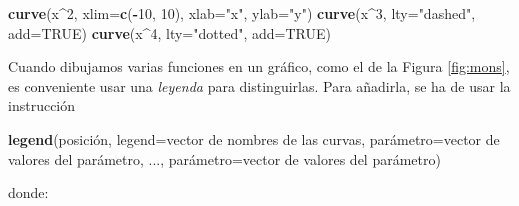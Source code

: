 \documentclass[
]{book}
\newenvironment{Shaded}{\begin{snugshade}}{\end{snugshade}}
\newcommand{\DataTypeTok}[1]{\textcolor[rgb]{0.13,0.29,0.53}{#1}}
\newcommand{\DecValTok}[1]{\textcolor[rgb]{0.00,0.00,0.81}{#1}}
\newcommand{\KeywordTok}[1]{\textcolor[rgb]{0.13,0.29,0.53}{\textbf{#1}}}
\newcommand{\NormalTok}[1]{#1}
\newcommand{\OperatorTok}[1]{\textcolor[rgb]{0.81,0.36,0.00}{\textbf{#1}}}
\newcommand{\OtherTok}[1]{\textcolor[rgb]{0.56,0.35,0.01}{#1}}
\newcommand{\StringTok}[1]{\textcolor[rgb]{0.31,0.60,0.02}{#1}}
\theoremstyle{definition}
\theoremstyle{definition}
\theoremstyle{definition}
\theoremstyle{remark}
\begin{document}
\begin{Shaded}
\begin{Highlighting}[]
\KeywordTok{curve}\NormalTok{(x}\OperatorTok{\^{}}\DecValTok{2}\NormalTok{, }\DataTypeTok{xlim=}\KeywordTok{c}\NormalTok{(}\OperatorTok{{-}}\DecValTok{10}\NormalTok{, }\DecValTok{10}\NormalTok{), }\DataTypeTok{xlab=}\StringTok{"x"}\NormalTok{, }\DataTypeTok{ylab=}\StringTok{"y"}\NormalTok{)}
\KeywordTok{curve}\NormalTok{(x}\OperatorTok{\^{}}\DecValTok{3}\NormalTok{, }\DataTypeTok{lty=}\StringTok{"dashed"}\NormalTok{, }\DataTypeTok{add=}\OtherTok{TRUE}\NormalTok{)}
\KeywordTok{curve}\NormalTok{(x}\OperatorTok{\^{}}\DecValTok{4}\NormalTok{, }\DataTypeTok{lty=}\StringTok{"dotted"}\NormalTok{, }\DataTypeTok{add=}\OtherTok{TRUE}\NormalTok{) }
\end{Highlighting}
\end{Shaded}

Cuando dibujamos varias funciones en un gráfico, como el de la Figura \ref{fig:mons}, es conveniente usar una \emph{leyenda} para distinguirlas. Para añadirla, se ha de usar la instrucción

\begin{Shaded}
\begin{Highlighting}[]
\KeywordTok{legend}\NormalTok{(posición, }\DataTypeTok{legend=}\NormalTok{vector de nombres de las curvas, }
\NormalTok{       parámetro=vector de  valores del parámetro, ..., }
\NormalTok{       parámetro=vector de  valores del parámetro)}
\end{Highlighting}
\end{Shaded}

donde:
\end{document}
